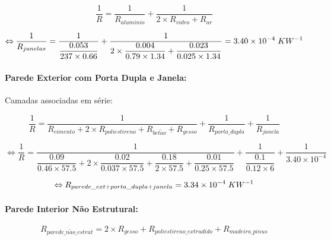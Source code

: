 \documentclass[12pt, a4paper]{article}
\begin{document}
\begin{equation}
	\dfrac{1}{R} = \dfrac{1}{R_{aluminio}} + \dfrac{1}{2 \times R_{vidro} + R_{ar}}
	\label{eq:zona_b_janelas}
\end{equation}

\begin{equation}
	\Leftrightarrow
	\dfrac{1}{R_{janelas}} =
		\dfrac{1}{
			\dfrac{0.053}{237 \times 0.66}
		}+
		\dfrac{1}{
			2 \times \dfrac{0.004}{0.79 \times 1.34} +
			\dfrac{0.023}{0.025 \times 1.34}
		}
		= 3.40 \times 10^{-4} \hspace{1mm} KW^{-1}
	\label{eq:zona_b_janelas2}
\end{equation}


\paragraph{Parede Exterior com Porta Dupla e Janela:}\label{par:zona_b_ext}Camadas associadas em série:

\begin{equation}
    \dfrac{1}{R} =
			\dfrac{1}{
			R_{cimento} + 2 \times R_{poliestireno} + R_{bet\tilde{a}o} + R_{gesso}
			}
			+
			\dfrac{1}{
				R_{porta\_dupla}
			}
			+
			\dfrac{1}{
				R_{janela}
			}
    \label{eq:zona_b_ext_1}
\end{equation}

\begin{equation}
    \Leftrightarrow \dfrac{1}{R} =
			\dfrac{1}{
				\dfrac{0.09}{0.46 \times 57.5} +
				2 \times \dfrac{0.02}{0.037 \times 57.5} +
				\dfrac{0.18}{2 \times 57.5} +
				\dfrac{0.01}{0.25 \times 57.5}
        	}
			+
			\dfrac{1}{
            	\dfrac{0.1}{0.12 \times 6}
			}
			+
			\dfrac{1}{
            	3.40 \times 10^{-4}
			}
    \label{eq:zona_b_ext_2}
\end{equation}

\begin{equation}
	\Leftrightarrow R_{parede\_ext + porta\_dupla + janela} = 3.34 \times 10^{-4} \hspace{1mm} KW^{-1}
	\label{eq:zona_b_ext_3}
\end{equation}

\paragraph{Parede Interior N\~ao Estrutural:}\label{par:zona_b_int_n_est}

\begin{equation}
	R_{parede\_n\tilde{a}o\_estrut} = 2 \times R_{gesso} + R_{poliestireno\_extrudido} + R_{madeira\_pinus}
	\label{eq:zona_b_int_n_est_1}
\end{equation}
\end{document}

